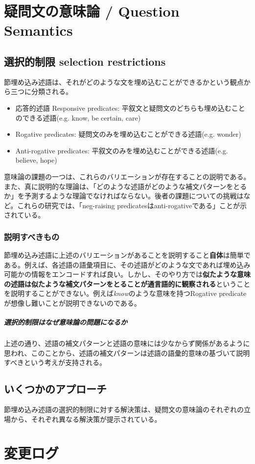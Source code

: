 \documentclass[dvipdfmx, a4paper,12pt,oneside,openany]{jsbook}
\begin{document}
\chapter{疑問文の意味論 / Question Semantics}
\section{選択的制限 selection restrictions}
節埋め込み述語は、それがどのような文を埋め込むことができるかという観点から三つに分類される。

\begin{itemize}
  \item 応答的述語 Responsive predicates: 平叙文と疑問文のどちらも埋め込むことのできる述語(e.g. know, be certain, care)
  \item Rogative predicates: 疑問文のみを埋め込むことができる述語(e.g. wonder)
  \item Anti-rogative predicates: 平叙文のみを埋め込むことができる述語(e.g. believe, hope)
\end{itemize}

意味論の課題の一つは、これらのバリエーションが存在することの説明である。また、真に説明的な理論は、「どのような述語がどのような補文パターンをとるか」を予測するような理論でなければならない。後者の課題についての挑戦は\cite{theiler2019picky,mayr2019triviality}など。これらの研究では、「neg-raising predicatesはanti-rogativeである」ことが示されている。

\subsection{説明すべきもの}
節埋め込み述語に上述のバリエーションがあることを説明すること\textbf{自体}は簡単である。例えば、各述語の語彙項目に、その述語がどのような文であれば埋め込み可能かの情報をエンコードすれば良い。しかし、そのやり方では\textbf{似たような意味の述語は似たような補文パターンをとることが通言語的に観察される}ということを説明することができない。例えば\textit{know}のような意味を持つRogative predicateが想像し難いことが説明できないのである。

\paragraph{選択的制限はなぜ意味論の問題になるか}
上述の通り、述語の補文パターンと述語の意味には少なからず関係があるように思われ、このことから、述語の補文パターンは述語の語彙的意味の基づいて説明すべきという考えが支持される。

\section{いくつかのアプローチ}
節埋め込み述語の選択的制限に対する解決策は、疑問文の意味論のそれぞれの立場から、それぞれ異なる解決策が提示されている。

\chapter*{変更ログ}




\end{document}
